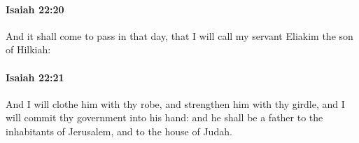 		\paragraph{Isaiah 22:20} %
			\label{ISAIAH-22-20}

			And it shall come to pass in that day, that I will call my servant Eliakim the son of Hilkiah:


		\paragraph{Isaiah 22:21} %
			\label{ISAIAH-22-21}

			And I will clothe him with thy robe, and strengthen him with thy girdle, and I will commit thy government into his hand: and he shall be a father to the inhabitants of Jerusalem, and to the house of Judah.


